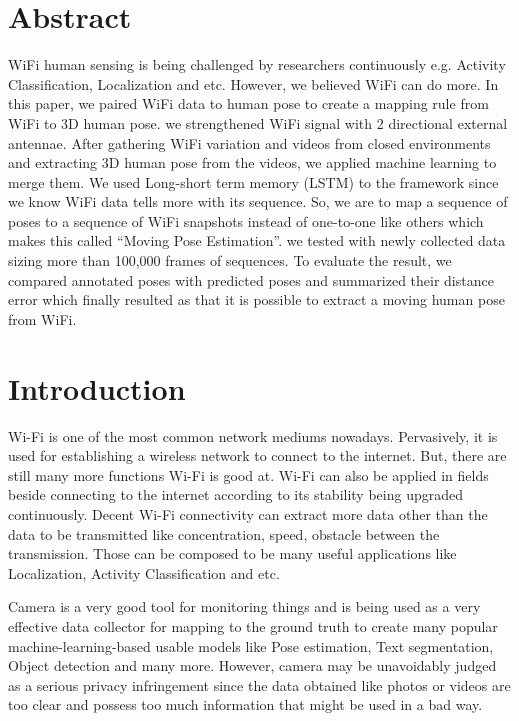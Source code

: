 \documentclass[10pt,letterpaper]{article}
\begin{document}
	\section*{Abstract}
	WiFi human sensing is being challenged by researchers continuously e.g. Activity Classification, Localization and etc. However, we believed WiFi can do more. In this paper, we paired WiFi data to human pose to create a mapping rule from WiFi to 3D human pose. we strengthened WiFi signal with 2 directional external antennae. After gathering WiFi variation and videos from closed environments and extracting 3D human pose from the videos, we applied machine learning to merge them. We used Long-short term memory (LSTM) to the framework since we know WiFi data tells more with its sequence. So, we are to map a sequence of poses to a sequence of WiFi snapshots instead of one-to-one like others which makes this called ``Moving Pose Estimation''. we tested with newly collected data sizing more than 100,000 frames of sequences. To evaluate the result, we compared annotated poses with predicted poses and summarized their distance error which finally resulted as that it is possible to extract a moving human pose from WiFi.
	

	
	\linenumbers
	
	\section*{Introduction}
	Wi-Fi is one of the most common network mediums nowadays. Pervasively, it is used for establishing a wireless network to connect to the internet. But, there are still many more functions Wi-Fi is good at. Wi-Fi can also be applied in fields beside connecting to the internet according to its stability being upgraded continuously. Decent Wi-Fi connectivity can extract more data other than the data to be transmitted like concentration, speed, obstacle between the transmission. Those can be composed to be many useful applications like Localization, Activity Classification and etc.
	
	
	Camera is a very good tool for monitoring things and is being used as a very effective data collector for mapping to the ground truth to create many popular machine-learning-based usable models like Pose estimation, Text segmentation, Object detection and many more. However, camera may be unavoidably judged as a serious privacy infringement since the data obtained like photos or videos are too clear and possess too much information that might be used in a bad way.
	
\end{document}
